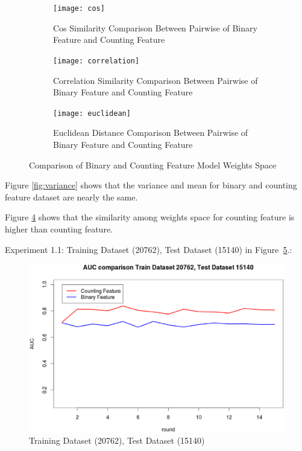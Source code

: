 \documentclass{sig-alternate}
\begin{document}
\begin{figure}
    \centering
    \begin{subfigure}[b]{0.3\textwidth}
        \centering
        \texttt{[image: cos]}
        \caption{Cos Similarity Comparison Between Pairwise of Binary Feature and Counting Feature}
        \label{fig:cos}
    \end{subfigure}
    \hfill
    \begin{subfigure}[b]{0.3\textwidth}
        \centering
        \texttt{[image: correlation]}
        \caption{Correlation Similarity Comparison Between Pairwise of Binary Feature and Counting Feature}
        \label{fig:correlation}
    \end{subfigure}
    \hfill
    \begin{subfigure}[b]{0.3\textwidth}
        \centering
        \texttt{[image: euclidean]}
        \caption{Euclidean Distance Comparison Between Pairwise of Binary Feature and Counting Feature}
        \label{fig:euclidean}
    \end{subfigure}
    \caption{Comparison of Binary and Counting Feature Model Weights Space}
    \label{fig:three graphs}
\end{figure}


Figure \ref{fig:variance} shows that the variance and mean for binary and counting feature dataset are nearly the same. 

Figure \ref{fig:three graphs} shows that the similarity among weights space for counting feature is higher than counting feature. 



\iffalse
Experiment 1.1: Training Dataset  (20762), Test Dataset  (15140) in Figure~\ref{fig:fig1}.:
\begin{figure}[h]
\centering
\includegraphics[width=\columnwidth]{20762_15140.eps}
\caption{Training Dataset  (20762), Test Dataset  (15140)}
\label{fig:fig1}
\end{figure}
\end{document}
